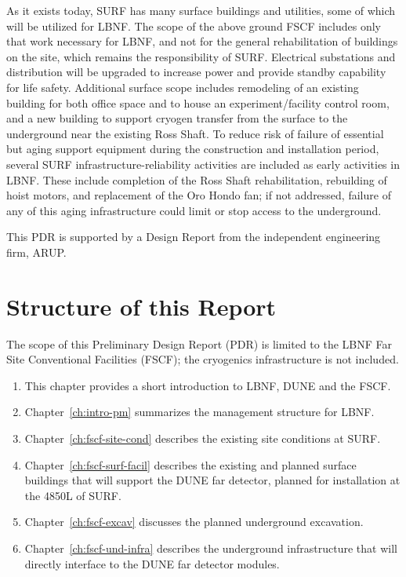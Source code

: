 As it exists today, SURF has many surface buildings and utilities, some of which will be utilized for LBNF. The scope of the above ground FSCF includes only that work necessary for LBNF, and not for the general rehabilitation of buildings on the site, which remains the responsibility of SURF. Electrical substations and distribution will be upgraded to increase power and provide standby capability for life safety. Additional surface scope includes remodeling of an existing building for both office space and to house an experiment/facility control room, and a new building to support cryogen transfer from the surface to the underground near the existing Ross Shaft. To reduce risk of failure of essential but aging support equipment during the construction and installation period, several SURF infrastructure-reliability activities are included as early activities in LBNF. These include completion of the Ross Shaft rehabilitation, rebuilding of hoist motors, and replacement of the Oro Hondo fan; if not addressed, failure of any of this aging infrastructure could limit or stop access to the underground.

This PDR is supported by a Design Report from the independent engineering firm, ARUP\cite{arup:fscf100pdr}.

\section{Structure of this Report}
\label{sec:pdr-volumes-fscf}

The scope of this Preliminary Design Report (PDR) is limited to the LBNF Far Site Conventional Facilities (FSCF); the cryogenics infrastructure is not included.
\begin{enumerate}
\item This chapter provides a short introduction to LBNF, DUNE and the FSCF.
\item Chapter~\ref{ch:intro-pm} summarizes the management structure for LBNF.
\item Chapter~\ref{ch:fscf-site-cond} describes the existing site conditions at SURF. 
\item Chapter~\ref{ch:fscf-surf-facil} describes the existing and planned surface buildings that will support the DUNE far detector, planned for installation at the 4850L of SURF.
\item Chapter~\ref{ch:fscf-excav} discusses the planned underground excavation. 
\item Chapter~\ref{ch:fscf-und-infra} describes the underground infrastructure that will directly interface to the DUNE far detector modules.
\end{enumerate}


